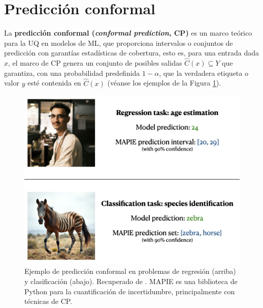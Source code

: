 \section{Predicción conformal}

La \textbf{predicción conformal (\textit{conformal prediction}, \acrshort{CP})} \cite{vovk2005, angelopoulos2021} es un marco teórico para la \acrshort{UQ} en modelos de \acrshort{ML}, que proporciona intervalos o conjuntos de predicción con garantías estadísticas de cobertura, esto es, para una entrada dada $x$, el marco de \acrshort{CP} genera un conjunto de posibles salidas $\hat{C}(x) \subseteq Y$ que garantiza, con una probabilidad predefinida $1-\alpha$, que la verdadera etiqueta o valor $y$ esté contenida en $\hat{C}(x)$ (véanse los ejemplos de la Figura 
\ref{fig:educational_visual}).

\begin{figure}[h]
    \centering
    \includegraphics[width=\textwidth]{capitulos/cap_02/imagenes/educational_visual.png}
    \caption[
        Ejemplo de predicción conformal en problemas de regresión y clasificación.
    ]{
        Ejemplo de predicción conformal en problemas de regresión (arriba) y clasificación (abajo).
        Recuperado de \cite{mapie-docs2023}. MAPIE es una biblioteca de Python para la cuantificación
        de incertidumbre, principalmente con técnicas de \acrshort{CP}. 
    } 
    \label{fig:educational_visual}
\end{figure}


